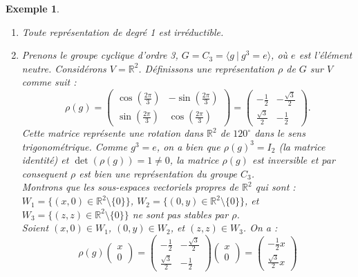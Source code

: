\documentclass[a4paper, 14pt]{report}
\newtheorem{example}{Exemple}[section]
\begin{document}
\begin{onehalfspace}
{\begin{example} 
	\begin{enumerate} \
		\item Toute représentation de degré 1 est irréductible.
		\item Prenons le groupe cyclique d'ordre 3, \( G = C_3 = \langle g \ | \ g^3 = e \rangle \), où \( e \) est l'élément neutre.
		Considérons \( V = \mathbb{R}^2 \). Définissons une représentation \( \rho \) de \( G \) sur \( V \) comme suit :
		\[
		\rho(g) =
		\begin{pmatrix}
			\cos\left(\frac{2\pi}{3}\right) & -\sin\left(\frac{2\pi}{3}\right) \\
			\sin\left(\frac{2\pi}{3}\right) & \cos\left(\frac{2\pi}{3}\right)
		\end{pmatrix}
		=
		\begin{pmatrix}
			-\frac{1}{2} & -\frac{\sqrt{3}}{2} \\
			\frac{\sqrt{3}}{2} & -\frac{1}{2}
		\end{pmatrix}.
		\]
Cette matrice représente une rotation dans \( \mathbb{R}^2 \) de \( 120^\circ \) dans le sens trigonométrique. Comme \( g^3 = e \), on a bien que \( \rho(g)^3 = I_2 \) (la matrice identité) et \(\det(\rho(g))=1 \neq 0\), la matrice \(\rho(g)\) est inversible et par consequent \( \rho \) est bien une représentation du groupe \( C_3 \).\\
Montrons que les sous-espaces vectoriels propres de \( \mathbb{R}^2 \) qui sont : 
		\( W_1 = \{ (x, 0) \in \mathbb{R}^2 \setminus \{0\} \} \), 
		\( W_2 = \{ (0, y) \in \mathbb{R}^2 \setminus \{0\} \} \), 
		et 
		\( W_3 = \{ (z, z) \in \mathbb{R}^2 \setminus \{0\} \} \) 
		ne sont pas stables par \( \rho \).\\
		Soient \( (x, 0) \in W_1 \), \( (0, y) \in W_2 \), et \( (z, z) \in W_3 \). On a :
		\[
		\rho(g) \begin{pmatrix} x \\ 0 \end{pmatrix} = 
		\begin{pmatrix} -\frac{1}{2} & -\frac{\sqrt{3}}{2} \\ \frac{\sqrt{3}}{2} & -\frac{1}{2} \end{pmatrix} 
		\begin{pmatrix} x \\ 0 \end{pmatrix} = 
		\begin{pmatrix} -\frac{1}{2}x \\ \frac{\sqrt{3}}{2}x \end{pmatrix}
\]
\end{enumerate}
\end{example}}
\end{onehalfspace}
\end{document}
